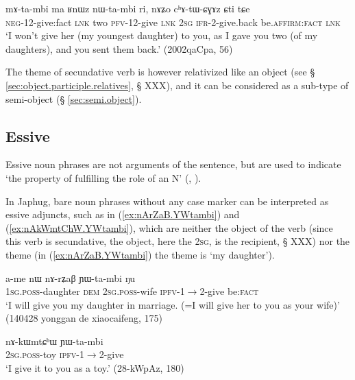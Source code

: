 \begin{exe}
\ex \label{ex:RnWz.nWtambi}
 \gll mɤ-ta-mbi ma ʁnɯz nɯ-ta-mbi ri, nɤʑo cʰɤ-tɯ-ɕɣɤz ɕti tɕe \\
 \textsc{neg}-1\fl{}2-give:fact \textsc{lnk} two  \textsc{pfv}-1\fl{}2-give \textsc{lnk} \textsc{2sg} \textsc{ifr}-2-give.back be.\textsc{affirm}:\textsc{fact} \textsc{lnk} \\
 \glt `I won't give her (my youngest daughter) to you, as I gave you two (of my daughters), and you sent them back.' (2002qaCpa, 56)
\end{exe}

The theme of secundative verb is however relativized like an object (see § \ref{sec:object.participle.relatives}, § XXX), and it can be considered as a sub-type of semi-object (§ \ref{sec:semi.object}).

\subsection{Essive} \label{sec:essive.abs}
Essive noun phrases are not arguments of the sentence, but are used to indicate `the property of fulfilling the role of an N' (\citealt[606]{creissels14functive}, \citealt[225]{jacques16complementation}).

In Japhug, bare noun phrases without any case marker can be interpreted as essive adjuncts, such as  in (\ref{ex:nArZaB.YWtambi}) and  (\ref{ex:nAkWmtChW.YWtambi}), which are neither the object of the verb  (since this verb is secundative, the object, here the \textsc{2sg}, is the recipient, § XXX) nor the theme (in (\ref{ex:nArZaB.YWtambi}) the theme is   `my daughter').

\begin{exe}
\ex \label{ex:nArZaB.YWtambi}
\gll   a-me nɯ nɤ-rʑaβ ɲɯ-ta-mbi ŋu \\
\textsc{1sg.poss}-daughter \textsc{dem} \textsc{2sg.poss}-wife \textsc{ipfv}-1$\rightarrow$2-give be:\textsc{fact} \\
\glt `I will give you my daughter in marriage. (=I will give her to you as your wife)' (140428 yonggan de xiaocaifeng, 175)
\end{exe}

\begin{exe}
\ex \label{ex:nAkWmtChW.YWtambi}
\gll  nɤ-kɯmtɕʰɯ ɲɯ-ta-mbi \\
 \textsc{2sg.poss}-toy \textsc{ipfv}-1$\rightarrow$2-give   \\
 \glt `I give it to you as a toy.' (28-kWpAz, 180)
\end{exe}

